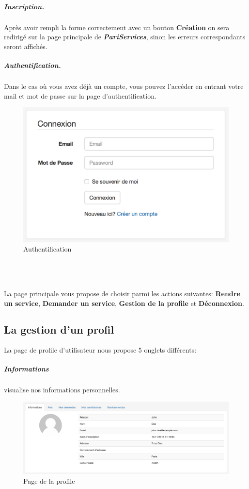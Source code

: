 \begin{minipage}{0.45\textwidth}
\subparagraph{Inscription.}Après avoir rempli la forme correctement avec un bouton \textbf{Création} on sera redirigé sur la page principale de \textbf{\textit{PariServices}}, sinon les erreurs correspondants seront affichés.\newline
\subparagraph{Authentification.} Dans le cas où vous avez déjà un compte, vous pouvez l'accéder en entrant votre mail et mot de passe sur la page d'authentification.
\begin{figure}[H]
	\includegraphics[width=1\textwidth]{images/manuel/signin}
	\caption{Authentification \label{overflow}}
\end{figure}
\end{minipage}\\\\\\

La page principale vous propose de choisir parmi les actions suivantes: \textbf{Rendre un service}, \textbf{Demander un service}, \textbf{Gestion de la profile} et \textbf{Déconnexion}.

\newpage
\subsection{La gestion d'un profil}
La page de profile d'utilisateur nous propose 5 onglets différents:

\subparagraph{Informations} visualise nos informations personnelles.

\begin{figure}[H]
	\includegraphics[width=1\textwidth]{images/manuel/profile}
	\caption{Page de la profile \label{overflow}}
\end{figure}

